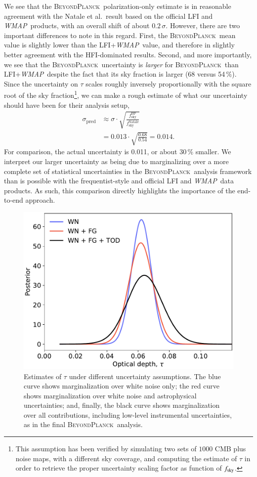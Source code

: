 \documentclass[onecolumn]{aa}
\def\WMAP{\textit{WMAP}}
\newcommand{\BP}{\textsc{BeyondPlanck}}
\begin{document}
We see that the \BP\ polarization-only estimate is in reasonable
agreement with the Natale et al.\ result based on the official LFI and
\WMAP\ products, with an overall shift of about
$0.2\,\sigma$. However, there are two important differences to note in
this regard. First, the \BP\ mean value is slightly lower than the
LFI+\WMAP\ value, and therefore in slightly better agreement with the
HFI-dominated results. Second, and more importantly, we see that the
\BP\ uncertainty is \emph{larger} for \BP\ than LFI+\WMAP\, despite
the fact that its sky fraction is larger (68 versus 54\,\%). Since the
uncertainty on $\tau$ scales roughly inversely proportionally with the
square root of the sky fraction\footnote{This assumption has been verified
by simulating two sets of $1000$ CMB plus noise maps, with a different
sky coverage, and computing the estimate of $\tau$ in order to retrieve
the proper uncertainty scaling factor as function of $f_{\rm{sky}}$.}, we can
make a rough estimate of what our uncertainty should have been for
their analysis setup,
\begin{align}
  \sigma_{\mathrm{pred}} &\approx
  \sigma\cdot\sqrt{\frac{f_{\mathrm{sky}}^{\mathrm{BP}}}{f_{\mathrm{sky}}^{\mathrm{Natale}}}}\\\
  &= 0.013\cdot \sqrt{\frac{0.68}{0.54}}= 0.014.
\end{align}
For comparison, the actual \citet{natale:2020} uncertainty is 0.011, or about 30\,\%
smaller. We interpret our larger uncertainty as being due to marginalizing over a more
complete set of statistical uncertainties in the \BP\ analysis
framework than is possible with the frequentist-style and official LFI
and \WMAP\ data products. As such, this comparison directly highlights
the importance of the end-to-end approach.

\begin{figure}[t]
	\center
	\includegraphics[width=0.7\linewidth]{figs/BP10_tau_syst_assess.pdf}
        \caption{Estimates of $\tau$ under different uncertainty
          assumptions. The blue curve shows marginalization over white
          noise only; the red 
          curve shows marginalization over white noise and
          astrophysical uncertainties; and, finally, the black curve
          shows marginalization over all contributions, including
          low-level instrumental uncertainties, as in the
          final \BP\ analysis.}
	\label{fig:tau_assess}
\end{figure}
\end{document}
